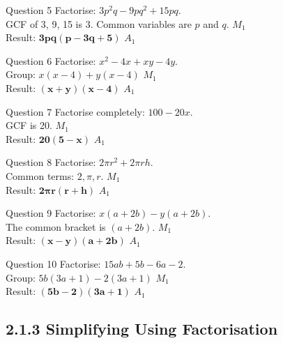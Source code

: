 \documentclass[12pt, a4paper, oneside]{article}
\begin{document}
\begin{solvingbox}{Question 5}
Factorise: $3p^2q - 9pq^2 + 15pq$. \\
GCF of 3, 9, 15 is 3. Common variables are $p$ and $q$. \hfill $M_1$ \\
Result: $\mathbf{3pq(p - 3q + 5)}$ \hfill $A_1$
\end{solvingbox}

\begin{solvingbox}{Question 6}
Factorise: $x^2 - 4x + xy - 4y$. \\
Group: $x(x - 4) + y(x - 4)$ \hfill $M_1$ \\
Result: $\mathbf{(x + y)(x - 4)}$ \hfill $A_1$
\end{solvingbox}

\begin{solvingbox}{Question 7}
Factorise completely: $100 - 20x$. \\
GCF is 20. \hfill $M_1$ \\
Result: $\mathbf{20(5 - x)}$ \hfill $A_1$
\end{solvingbox}

\begin{solvingbox}{Question 8}
Factorise: $2\pi r^2 + 2\pi rh$. \\
Common terms: $2, \pi, r$. \hfill $M_1$ \\
Result: $\mathbf{2\pi r(r + h)}$ \hfill $A_1$
\end{solvingbox}

\begin{solvingbox}{Question 9}
Factorise: $x(a + 2b) - y(a + 2b)$. \\
The common bracket is $(a + 2b)$. \hfill $M_1$ \\
Result: $\mathbf{(x - y)(a + 2b)}$ \hfill $A_1$
\end{solvingbox}

\begin{solvingbox}{Question 10}
Factorise: $15ab + 5b - 6a - 2$. \\
Group: $5b(3a + 1) - 2(3a + 1)$ \hfill $M_1$ \\
Result: $\mathbf{(5b - 2)(3a + 1)}$ \hfill $A_1$
\end{solvingbox}

\subsection*{2.1.3 Simplifying Using Factorisation}
\end{document}
